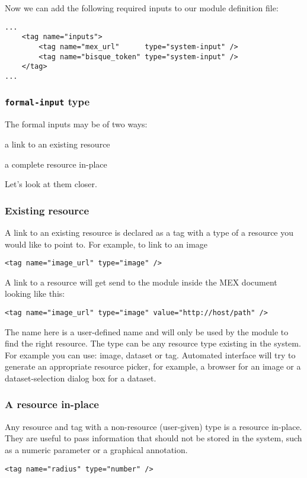 Now we can add the following required inputs to our module definition file:
\begin{verbatim}
...
    <tag name="inputs">
        <tag name="mex_url"      type="system-input" />
        <tag name="bisque_token" type="system-input" />
    </tag>
...
\end{verbatim}

\subsubsection{\texttt{formal-input} type}
The formal inputs may be of two ways:
\begin{itemize*}
\item 	a link to an existing resource
\item	a complete resource in-place 
\end{itemize*}

Let's look at them closer.

\subsubsection*{Existing resource}
A link to an existing resource is declared as a tag with a type of a resource you would like to point to. For example, to link to an image
\begin{verbatim}
<tag name="image_url" type="image" />
\end{verbatim}

A link to a resource will get send to the module inside the MEX document looking like this:
\begin{verbatim}
<tag name="image_url" type="image" value="http://host/path" />
\end{verbatim}
The name here is a user-defined name and will only be used by the module to find the right resource. 
The type can be any resource type existing in the system. For example you can use: image, dataset or tag. 
Automated interface will try to generate an appropriate resource picker, for example, a browser for an image or a dataset-selection dialog box for a dataset. 

\subsubsection*{A resource in-place}
Any resource and tag with a non-resource (user-given) type is a resource in-place. They are useful to pass information that should not be stored in the system, such as a numeric parameter or a graphical annotation.
\begin{verbatim}
<tag name="radius" type="number" />
\end{verbatim}

